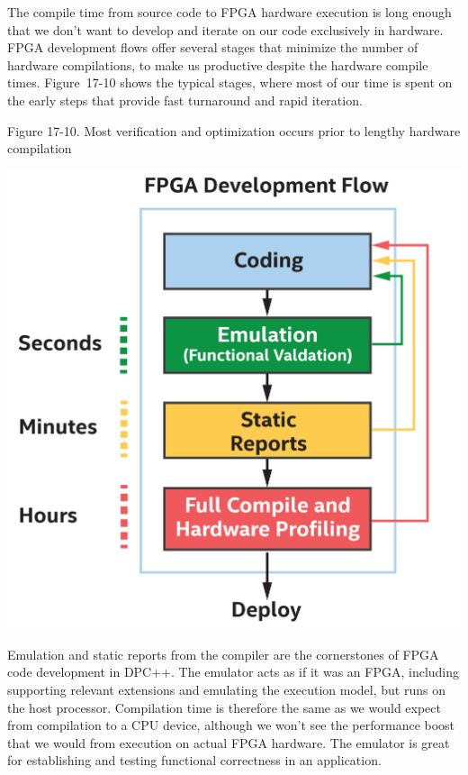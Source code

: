The compile time from source code to FPGA hardware execution is long enough that we don’t want to develop and iterate on our code exclusively in hardware. FPGA development flows offer several stages that minimize the number of hardware compilations, to make us productive despite the hardware compile times. Figure 17-10 shows the typical stages, where most of our time is spent on the early steps that provide fast turnaround and rapid iteration.\par

\hspace*{\fill} \par %
Figure 17-10. Most verification and optimization occurs prior to lengthy hardware compilation
\begin{center}
	\includegraphics[width=1.0\textwidth]{content/chapter-17/images/10}
\end{center}

Emulation and static reports from the compiler are the cornerstones of FPGA code development in DPC++. The emulator acts as if it was an FPGA, including supporting relevant extensions and emulating the execution model, but runs on the host processor. Compilation time is therefore the same as we would expect from compilation to a CPU device, although we won’t see the performance boost that we would from execution on actual FPGA hardware. The emulator is great for establishing and testing functional correctness in an application.\par

